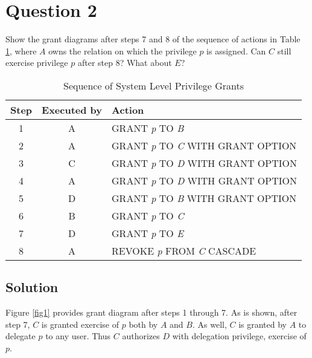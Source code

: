 
\section*{Question 2}

Show the grant diagrams after steps 7 and 8 of the sequence of actions in Table \ref{table4}, where $A$ owns the relation on which the privilege $p$ is assigned.
Can $C$ still exercise privilege $p$ after step 8? What about $E$?

\begin{table}[H]
\centering
\begin{tabular}{|c|c|l|}
\hline
Step & Executed by & Action\\
\hline \hline
1 & A & GRANT \textit{p} TO \textit{B}\\
2 & A & GRANT \textit{p} TO \textit{C} WITH GRANT OPTION\\
3 & C & GRANT \textit{p} TO \textit{D} WITH GRANT OPTION\\
4 & A & GRANT \textit{p} TO \textit{D} WITH GRANT OPTION\\
5 & D & GRANT \textit{p} TO \textit{B} WITH GRANT OPTION\\
6 & B & GRANT \textit{p} TO \textit{C}\\
7 & D & GRANT \textit{p} TO \textit{E}\\
8 & A & REVOKE \textit{p} FROM \textit{C} CASCADE\\
\hline
\end{tabular}
\caption{Sequence of System Level Privilege Grants}\label{table4}
\end{table}

\subsection*{Solution}

Figure \ref{fig1} provides grant diagram after steps 1 through 7.
As is shown, after step 7, $C$ is granted exercise of $\textit{p}$ both by $A$ and $B$.
As well, $C$ is granted by $A$ to delegate $p$ to any user.
Thus $C$ authorizes $D$ with delegation privilege, exercise of $\textit{p}$.

